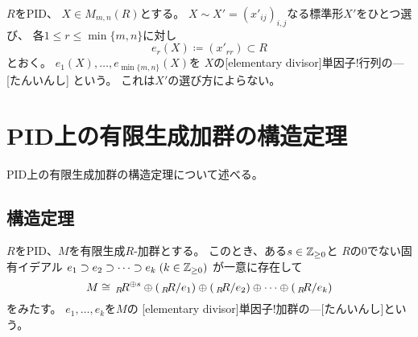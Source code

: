 \documentclass[report]{jlreq}
\begin{document}
\begin{definition}[単因子]
    $R$をPID、
    $X \in M_{m, n}(R)$とする。
    $X \sim X' = (x'_{ij})_{i, j}$なる標準形$X'$をひとつ選び、
    各$1 \le r \le \min\{m, n\}$に対し
    \begin{equation}
        e_r(X) \coloneqq (x'_{rr}) \subset R
    \end{equation}
    とおく。
    $e_1(X), \dots, e_{\min\{m, n\}}(X)$を
    $X$の[elementary divisor]{単因子!行列の---}[たんいんし]
    という。
    これは$X'$の選び方によらない。
\end{definition}



%
\section{PID上の有限生成加群の構造定理}

PID上の有限生成加群の構造定理について述べる。

\subsection{構造定理}

\begin{theorem}[単因子分解]
    $R$をPID、$M$を有限生成$R$-加群とする。
    このとき、ある$s \in \mathbb{Z}_{\ge 0}$と
    $R$の$0$でない固有イデアル
    $e_1 \supset e_2 \supset \cdots \supset e_k \; (k \in \mathbb{Z}_{\ge 0})$
    が一意に存在して
    \begin{equation}
        M \cong \,{}_{R}\!R^{\oplus s}
            \oplus (\,{}_{R}\!R / e_1)
            \oplus (\,{}_{R}\!R / e_2)
            \oplus \cdots
            \oplus (\,{}_{R}\!R / e_k)
    \end{equation}
    をみたす。
    $e_1, \dots, e_k$を$M$の
    [elementary divisor]{単因子!加群の---}[たんいんし]という。
\end{theorem}
\end{document}
